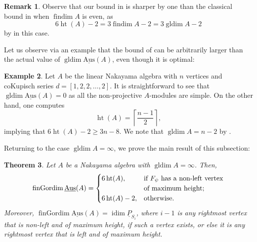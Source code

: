 \documentclass[a4paper]{amsart}
\newtheorem{theorem}{Theorem}[section]
\theoremstyle{definition}
\newtheorem{remark}[theorem]{Remark}
\newtheorem{example}[theorem]{Example}
\theoremstyle{remark}
\numberwithin{equation}{theorem}
\newcommand{\findim}{\operatorname{findim}}
\newcommand{\sAus}{\operatorname{\underline{Aus}}}
\newcommand{\pstab}[1]{\underline{P}_{#1}}
\newcommand{\fingordim}{\operatorname{finGordim}}
\newcommand{\height}{\operatorname{ht}}
\newcommand{\idim}{\operatorname{idim}}
\newcommand{\gldim}{\operatorname{gldim}}
\newcommand{\psiforest}{F_\psi}
\begin{document}
  \begin{remark}
      Observe that our bound in  is sharper by one than the classical bound in \cite{AR} when $ \findim A $ is even, as
        \[
            6 \height(A) - 2 = 3 \findim A - 2 = 3 \gldim A - 2
        \]
    by  in this case.
  \end{remark}

Let us observe via an example that the bound of  can be arbitrarily larger than the actual value of $ \gldim \sAus(A) $, even though it is optimal:

  \begin{example}\label{arbitrarily.larger}
      Let $ A $ be the linear Nakayama algebra with $ n $ vertices and coKupisch series $ d = [1,2,2, \ldots ,2] $. It is straightforward to see that $ \gldim \sAus(A) = 0 $ as all the non-projective $ A $-modules are simple. On the other hand, one computes
      $$ \height(A) = \left\lceil \frac{n-1}{2} \right\rceil ,  $$
      implying that $ 6 \height(A) - 2 \geq 3 n - 8 $.
      We note that
      $ \gldim A = n - 2 $
      by .
  \end{example}

Returning to the case $ \gldim A = \infty $, we prove the main result of this subsection:

\begin{theorem}\label{prop:infinite:height}
    Let $A$ be a Nakayama algebra with $\gldim A = \infty$. Then,
        \[
            \fingordim \sAus(A)  =  \begin{cases}
                6 \height(A) , & \text{if $ \psiforest $ has a non-left vertex} \\
                               & \text{of maximum height;} \\
                6 \height(A)-2 , & \text{otherwise.}
                    \end{cases}
        \]
    Moreover, $ \fingordim \sAus(A) = \idim \pstab{S_i} $, where $ i-1 $ is any rightmost vertex that is non-left and of maximum height, if such a vertex exists, or else it is any rightmost vertex that is left and of maximum height.
\end{theorem}
\end{document}
